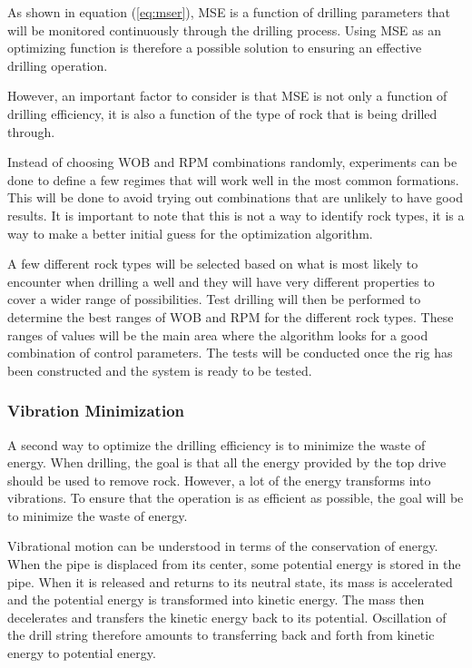 As shown in equation (\ref{eq:mser}), MSE is a function of drilling parameters that will be monitored continuously through the drilling process. Using MSE as an optimizing function is therefore a possible solution to ensuring an effective drilling operation. 

However, an important factor to consider is that MSE is not only a function of drilling efficiency, it is also a function of the type of rock that is being drilled through.

Instead of choosing WOB and RPM combinations randomly, experiments can be done to define a few regimes that will work well in the most common formations. This will be done to avoid trying out combinations that are unlikely to have good results. It is important to note that this is not a way to identify rock types, it is a way to make a better initial guess for the optimization algorithm.

A few different rock types will be selected based on what is most likely to encounter when drilling a well and they will have very different properties to cover a wider range of possibilities. Test drilling will then be performed to determine the best ranges of WOB and RPM for the different rock types. These ranges of values will be the main area where the algorithm looks for a good combination of control parameters. The tests will be conducted once the rig has been constructed and the system is ready to be tested.

\subsubsection{Vibration Minimization}

A second way to optimize the drilling efficiency is to minimize the waste of energy. When drilling, the goal is that all the energy provided by the top drive should be used to remove rock. However, a lot of the energy transforms into vibrations. To ensure that the operation is as efficient as possible, the goal will be to minimize the waste of energy.

Vibrational motion can be understood in terms of the conservation of energy. When the pipe is displaced from its center, some potential energy is stored in the pipe. When it is released and returns to its neutral state, its mass is accelerated and the potential energy is transformed into kinetic energy. The mass then decelerates and transfers the kinetic energy back to its potential. Oscillation of the drill string therefore amounts to transferring back and forth from kinetic energy to potential energy.

